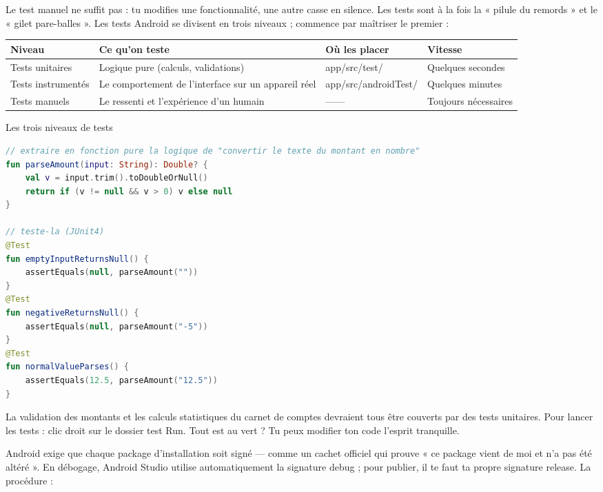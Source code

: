 Le test manuel ne suffit pas : tu modifies une fonctionnalité, une autre casse en silence. Les tests sont à la fois la « pilule du remords » et le « gilet pare-balles ». Les tests Android se divisent en trois niveaux ; commence par maîtriser le premier :

\begin{center}
\begin{tabularx}{\linewidth}{|X|X|X|X|}
\hline
\textbf{Niveau} & \textbf{Ce qu’on teste} & \textbf{Où les placer} & \textbf{Vitesse} \tabularnewline
\hline
Tests unitaires & Logique pure (calculs, validations) & app/src/test/ & Quelques secondes \tabularnewline
Tests instrumentés & Le comportement de l’interface sur un appareil réel & app/src/androidTest/ & Quelques minutes \tabularnewline
Tests manuels & Le ressenti et l’expérience d’un humain & —— & Toujours nécessaires \tabularnewline
\hline
\end{tabularx}
\end{center}

\begin{center}\small\color{gray}Les trois niveaux de tests\end{center}

\begin{lstlisting}[language=Kotlin]
// extraire en fonction pure la logique de "convertir le texte du montant en nombre"
fun parseAmount(input: String): Double? {
    val v = input.trim().toDoubleOrNull()
    return if (v != null && v > 0) v else null
}

// teste-la (JUnit4)
@Test
fun emptyInputReturnsNull() {
    assertEquals(null, parseAmount(""))
}
@Test
fun negativeReturnsNull() {
    assertEquals(null, parseAmount("-5"))
}
@Test
fun normalValueParses() {
    assertEquals(12.5, parseAmount("12.5"))
}
\end{lstlisting}

La validation des montants et les calculs statistiques du carnet de comptes devraient tous être couverts par des tests unitaires. Pour lancer les tests : clic droit sur le dossier test Run. Tout est au vert ? Tu peux modifier ton code l’esprit tranquille.


Android exige que chaque package d’installation soit signé — comme un cachet officiel qui prouve « ce package vient de moi et n’a pas été altéré ». En débogage, Android Studio utilise automatiquement la signature debug ; pour publier, il te faut ta propre signature release. La procédure :

